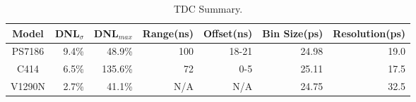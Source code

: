 \begin{table}[]
\centering
\caption{TDC Summary.}
\begin{tabular}{c r r r r r r }
\hline
Model & DNL$_{\sigma}$ & DNL$_{max}$ & Range(ns) & Offset(ns) & Bin Size(ps) & Resolution(ps) \\
\hline\hline
PS7186 & 9.4\% & 48.9\% & 100 & 18-21 & 24.98 & 19.0 \\
C414 & 6.5\% & 135.6\% & 72 & 0-5 & 25.11 & 17.5 \\
V1290N & 2.7\% & 41.1\% & N/A & N/A & 24.75 & 32.5 \\
\hline
\end{tabular}
\label{tab:TDC}
\end{table}

